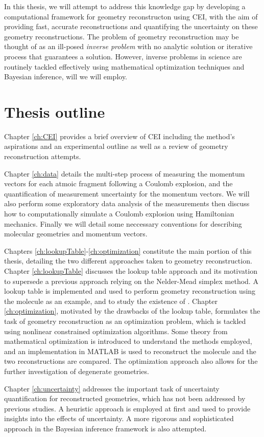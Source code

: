 In this thesis, we will attempt to address this knowledge gap by developing a computational framework for geometry reconstructon using CEI, with the aim of providing fast, accurate reconstructions and quantifying the uncertainty on these geometry reconstructions. The problem of geometry reconstruction may be thought of as an ill-posed \emph{inverse problem} with no analytic solution or iterative process that guarantees a solution. However, inverse problems in science are routinely tackled effectively using mathematical optimization techniques and Bayesian inference, will we will employ.

\section*{Thesis outline}
Chapter \ref{ch:CEI} provides a brief overview of CEI including the method's aspirations and an experimental outline as well as a review of geometry reconstruction attempts.

Chapter \ref{ch:data} details the multi-step process of measuring the momentum vectors for each atmoic fragment following a Coulomb explosion, and the quantification of measurement uncertainty for the momentum vectors. We will also perform some exploratory data analysis of the measurements then discuss how to computationally simulate a Coulomb explosion using Hamiltonian mechanics. Finally we will detail some neccessary conventions for describing molecular geometries and momentum vectors.

Chapters \ref{ch:lookupTable}-\ref{ch:optimization} constitute the main portion of this thesis, detailing the two different approaches taken to geometry reconstruction. Chapter \ref{ch:lookupTable} discusses the lookup table approach and its motivation to supersede a previous approach relying on the Nelder-Mead simplex method. A lookup table is implemented and used to perform geometry reconstruction using the  molecule as an example, and to study the existence of . Chapter \ref{ch:optimization}, motivated by the drawbacks of the lookup table, formulates the task of geometry reconstruction as an optimization problem, which is tackled using nonlinear constrained optimization algorithms. Some theory from mathematical optimization is introduced to understand the methods employed, and an implementation in MATLAB is used to reconstruct the  molecule and the two reconstructions are compared. The optimization approach also allows for the further investigation of degenerate geometries.

Chapter \ref{ch:uncertainty} addresses the important task of uncertainty quantification for reconstructed geometries, which has not been addressed by previous studies. A heuristic approach is employed at first and used to provide insights into the effects of uncertainty. A more rigorous and sophisticated approach in the Bayesian inference framework is also attempted.